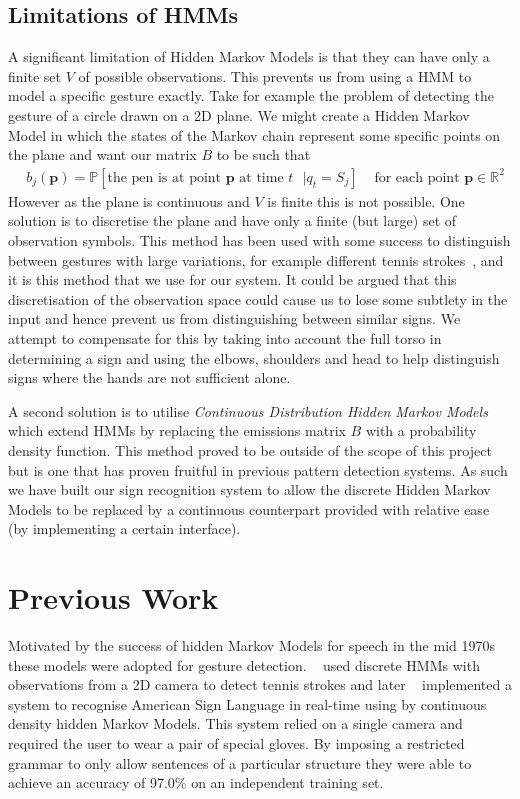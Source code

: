 \subsection{Limitations of HMMs}
A significant limitation of Hidden Markov Models is that they can have only a finite set $V$ of possible observations. This prevents us from using a HMM to model a specific gesture exactly. Take for example the problem of detecting the gesture of a circle drawn on a 2D plane. We might create a Hidden Markov Model in which the states of the Markov chain represent some specific points on the plane and want our matrix $B$ to be such that
\begin{align*}
&b_j(\bm{p}) = \mathbb{P}[\text{the pen is at point $\bm{p}$ at time $t$ } | q_t = S_j] &\text{ for each point $\bm{p}\in\mathbb{R}^2$}
\end{align*}
However as the plane is continuous and $V$ is finite this is not possible. One solution is to discretise the plane and have only a finite (but large) set of observation symbols. This method has been used with some success to distinguish between gestures with large variations, for example different tennis strokes~\citep{yamato1992recognizing}, and it is this method that we use for our system. It could be argued that this discretisation of the observation space could cause us to lose some subtlety in the input and hence prevent us from distinguishing between similar signs. We attempt to compensate for this by taking into account the full torso in determining a sign and using the elbows, shoulders and head to help distinguish signs where the hands are not sufficient alone.

A second solution is to utilise \emph{Continuous Distribution Hidden Markov Models} which extend HMMs by replacing the emissions matrix $B$ with a probability density function. This method proved to be outside of the scope of this project but is one that has proven fruitful in previous pattern detection systems. As such we have built our sign recognition system to allow the discrete Hidden Markov Models to be replaced by a continuous counterpart provided with relative ease (by implementing a certain interface).

\section{Previous Work}
Motivated by the success of hidden Markov Models for speech in the mid 1970s \citep{baker1975dragon, jelinek1975design} these models were adopted for gesture detection. ~\citet{yamato1992recognizing} used discrete HMMs with observations from a 2D camera to detect tennis strokes and later ~\citet{starner1995real} implemented a system to recognise American Sign Language in real-time using by continuous density hidden Markov Models. This system relied on a single camera and required the user to wear a pair of special gloves. By imposing a restricted grammar to only allow sentences of a particular structure they were able to achieve an accuracy of 97.0\% on an independent training set. 

